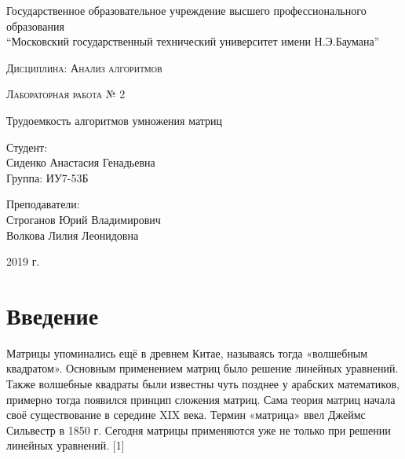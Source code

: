 \documentclass[a4paper,14pt]{article} %
\newcommand{\anonsection}[1]{\section*{#1}\addcontentsline{toc}{section}{#1}}
\begin{document}
	\begin{titlepage}

       		\begin{center}
         		\large
		
        			Государственное образовательное учреждение высшего профессионального образования\\
       			“Московский государственный технический университет имени Н.Э.Баумана”
         		\vspace{3cm}
            
            		\textsc{Дисциплина: Анализ алгоритмов}
           		\vspace{0.5cm}
                
            		\textsc{Лабораторная работа № 2}
           		 \vspace{3cm}
            
           		 \LARGE 
		 
		 	Трудоемкость алгоритмов умножения матриц
           		 \vspace{3cm}
            
            		\begin{flushright}
            			Студент: \\
				Сиденко Анастасия Генадьевна \\   
            			Группа: ИУ7-53Б \\
           			\hfill
            
           			Преподаватели: \\
				Строганов Юрий Владимирович \\
           			Волкова Лилия Леонидовна
            			\vfill
            		\end{flushright}
		
			\large
            		2019 г.
		\end{center}

	\end{titlepage}
    
	\tableofcontents
	
	\newpage
    
	\anonsection{Введение}
	\hfill
	
	Матрицы упоминались ещё в древнем Китае, называясь тогда «волшебным квадратом». Основным применением матриц было решение линейных уравнений. Также волшебные квадраты были известны чуть позднее у арабских математиков, примерно тогда появился принцип сложения матриц. Сама теория матриц начала своё существование в середине XIX века. Термин «матрица» ввел Джеймс Сильвестр в 1850 г. Сегодня матрицы применяются уже не только при решении линейных уравнений. [1]
	
\end{document}
